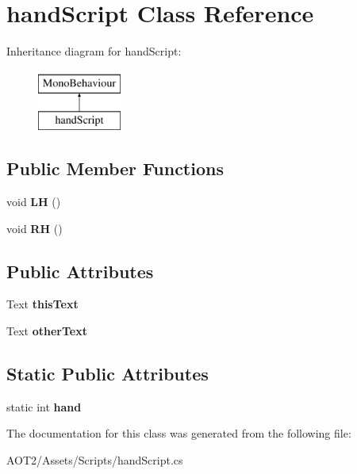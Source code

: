 \hypertarget{classhand_script}{}\section{hand\+Script Class Reference}
\label{classhand_script}
Inheritance diagram for hand\+Script\+:\begin{figure}[H]
\begin{center}
\leavevmode
\includegraphics[height=2.000000cm]{classhand_script}
\end{center}
\end{figure}
\subsection*{Public Member Functions}
\begin{DoxyCompactItemize}
\item 
\hypertarget{classhand_script_a62e593760441c466a04fd26d536cb67a}{}void {\bfseries L\+H} ()\label{classhand_script_a62e593760441c466a04fd26d536cb67a}

\item 
\hypertarget{classhand_script_a64481676bd93e645bed1e263edade065}{}void {\bfseries R\+H} ()\label{classhand_script_a64481676bd93e645bed1e263edade065}

\end{DoxyCompactItemize}
\subsection*{Public Attributes}
\begin{DoxyCompactItemize}
\item 
\hypertarget{classhand_script_a2f300212a9a7f2528c525060eb9d17e4}{}Text {\bfseries this\+Text}\label{classhand_script_a2f300212a9a7f2528c525060eb9d17e4}

\item 
\hypertarget{classhand_script_a2e323ace258263f11a78df53dd7644bd}{}Text {\bfseries other\+Text}\label{classhand_script_a2e323ace258263f11a78df53dd7644bd}

\end{DoxyCompactItemize}
\subsection*{Static Public Attributes}
\begin{DoxyCompactItemize}
\item 
\hypertarget{classhand_script_a6ead5b70e39c2831d69fdab64c1226ff}{}static int {\bfseries hand}\label{classhand_script_a6ead5b70e39c2831d69fdab64c1226ff}

\end{DoxyCompactItemize}


The documentation for this class was generated from the following file\+:\begin{DoxyCompactItemize}
\item 
A\+O\+T2/\+Assets/\+Scripts/hand\+Script.\+cs\end{DoxyCompactItemize}

